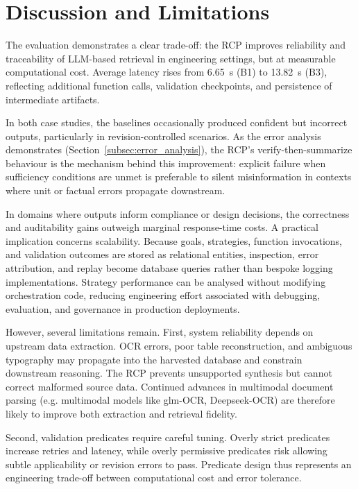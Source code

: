 \documentclass[largeformat]{interact}
\begin{document}
\section{Discussion and Limitations}
\label{sec:Discussion}
The evaluation demonstrates a clear trade-off: the RCP improves reliability and traceability of LLM-based retrieval in engineering settings, but at measurable computational cost. Average latency rises from 6.65~s (B1) to 13.82~s (B3), reflecting additional function calls, validation checkpoints, and persistence of intermediate artifacts.

In both case studies, the baselines occasionally produced confident but incorrect outputs, particularly in revision-controlled scenarios. As the error analysis demonstrates (Section~\ref{subsec:error_analysis}), the RCP's verify-then-summarize behaviour is the mechanism behind this improvement: explicit failure when sufficiency conditions are unmet is preferable to silent misinformation in contexts where unit or factual errors propagate downstream.

In domains where outputs inform compliance or design decisions, the correctness and auditability gains outweigh marginal response-time costs. A practical implication concerns scalability. Because goals, strategies, function invocations, and validation outcomes are stored as relational entities, inspection, error attribution, and replay become database queries rather than bespoke logging implementations. Strategy performance can be analysed without modifying orchestration code, reducing engineering effort associated with debugging, evaluation, and governance in production deployments.

\noindent However, several limitations remain.
First, system reliability depends on upstream data extraction. OCR errors, poor table reconstruction, and ambiguous typography may propagate into the harvested database and constrain downstream reasoning. The RCP prevents unsupported synthesis but cannot correct malformed source data. Continued advances in multimodal document parsing (e.g. multimodal models like glm-OCR, Deepseek-OCR) are therefore likely to improve both extraction and retrieval fidelity.

Second, validation predicates require careful tuning. Overly strict predicates increase retries and latency, while overly permissive predicates risk allowing subtle applicability or revision errors to pass. Predicate design thus represents an engineering trade-off between computational cost and error tolerance.
\end{document}
